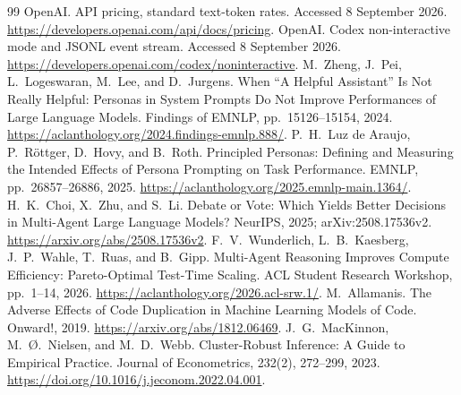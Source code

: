 \begin{thebibliography}{99}
 OpenAI. API pricing, standard text-token rates. Accessed 8 September 2026. \url{https://developers.openai.com/api/docs/pricing}.
 OpenAI. Codex non-interactive mode and JSONL event stream. Accessed 8 September 2026. \url{https://developers.openai.com/codex/noninteractive}.
 M.~Zheng, J.~Pei, L.~Logeswaran, M.~Lee, and D.~Jurgens. When ``A Helpful Assistant'' Is Not Really Helpful: Personas in System Prompts Do Not Improve Performances of Large Language Models. Findings of EMNLP, pp.~15126--15154, 2024. \url{https://aclanthology.org/2024.findings-emnlp.888/}.
 P.~H.~Luz de Araujo, P.~R{\"o}ttger, D.~Hovy, and B.~Roth. Principled Personas: Defining and Measuring the Intended Effects of Persona Prompting on Task Performance. EMNLP, pp.~26857--26886, 2025. \url{https://aclanthology.org/2025.emnlp-main.1364/}.
 H.~K.~Choi, X.~Zhu, and S.~Li. Debate or Vote: Which Yields Better Decisions in Multi-Agent Large Language Models? NeurIPS, 2025; arXiv:2508.17536v2. \url{https://arxiv.org/abs/2508.17536v2}.
 F.~V.~Wunderlich, L.~B.~Kaesberg, J.~P.~Wahle, T.~Ruas, and B.~Gipp. Multi-Agent Reasoning Improves Compute Efficiency: Pareto-Optimal Test-Time Scaling. ACL Student Research Workshop, pp.~1--14, 2026. \url{https://aclanthology.org/2026.acl-srw.1/}.
 M.~Allamanis. The Adverse Effects of Code Duplication in Machine Learning Models of Code. Onward!, 2019. \url{https://arxiv.org/abs/1812.06469}.
 J.~G.~MacKinnon, M.~\O.~Nielsen, and M.~D.~Webb. Cluster-Robust Inference: A Guide to Empirical Practice. Journal of Econometrics, 232(2), 272--299, 2023. \url{https://doi.org/10.1016/j.jeconom.2022.04.001}.
\end{thebibliography}
